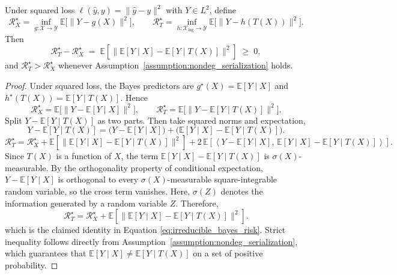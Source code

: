 \documentclass{llmxive}
\begin{document}
{\begin{lemma}
\label{lem:bayes_gap}
Under squared loss $\ell(\hat y,y)=\|\hat y-y\|^2$ with $Y\in L^2$, define
\begin{equation}
\mathcal{R}_X^\star=\inf_{g:\mathcal{X}\to\mathcal{Y}}\mathbb{E}\big[\|Y-g(X)\|^2\big],
\qquad
\mathcal{R}_T^\star=\inf_{h:\mathcal{X}_{\mathrm{lng}}\to\mathcal{Y}}\mathbb{E}\big[\|Y-h(T(X))\|^2\big].
\end{equation}
Then
\begin{equation}
\label{eq:irreducible_bayes_risk}
\mathcal{R}_T^\star - \mathcal{R}_X^\star
\;=\;
\mathbb{E}\!\left[\big\|\mathbb{E}[Y\mid X]-\mathbb{E}[Y\mid T(X)]\big\|^2\right]
\;\ge\; 0,
\end{equation}
and $\mathcal{R}_T^\star > \mathcal{R}_X^\star$ whenever Assumption~\ref{assumption:nondeg_serialization} holds.
\end{lemma}
\begin{proof}
Under squared loss, the Bayes predictors are $g^\star(X)=\mathbb{E}[Y\mid X]$ and $h^\star(T(X))=\mathbb{E}[Y\mid T(X)]$. Hence
\begin{equation}
\mathcal{R}_X^\star
=
\mathbb{E}\big[\|Y-\mathbb{E}[Y\mid X]\|^2\big],
\qquad
\mathcal{R}_T^\star
=
\mathbb{E}\big[\|Y-\mathbb{E}[Y\mid T(X)]\|^2\big].
\end{equation}
Split $Y-\mathbb{E}[Y\mid T(X)]$ as two parts. Then take squared norms and expectation,
\begin{equation}
Y-\mathbb{E}[Y\mid T(X)]
=
\big(Y-\mathbb{E}[Y\mid X]\big)
+
\big(\mathbb{E}[Y\mid X]-\mathbb{E}[Y\mid T(X)]\big).
\end{equation}
\begin{equation}
\mathcal{R}_T^\star=
\mathcal{R}_X^\star
+
\mathbb{E}\!\left[\big\|\mathbb{E}[Y\mid X]-\mathbb{E}[Y\mid T(X)]\big\|^2\right] 
+2\,\mathbb{E}\!\left[
\left\langle
Y-\mathbb{E}[Y\mid X],\,
\mathbb{E}[Y\mid X]-\mathbb{E}[Y\mid T(X)]
\right\rangle
\right].
\end{equation}
Since $T(X)$ is a function of $X$, the term $\mathbb{E}[Y\mid X]-\mathbb{E}[Y\mid T(X)]$ is $\sigma(X)$-measurable. By the orthogonality property of conditional expectation, $Y-\mathbb{E}[Y\mid X]$ is orthogonal to every $\sigma(X)$-measurable square-integrable random variable, so the cross term vanishes. Here, $\sigma(Z)$ denotes the information generated by a random variable $Z$. Therefore,
\begin{equation}
\mathcal{R}_T^\star
=
\mathcal{R}_X^\star
+
\mathbb{E}\!\left[\big\|\mathbb{E}[Y\mid X]-\mathbb{E}[Y\mid T(X)]\big\|^2\right].
\end{equation}
which is the claimed identity in Equation \ref{eq:irreducible_bayes_risk}. Strict inequality follows directly from Assumption~\ref{assumption:nondeg_serialization}, which guarantees that $\mathbb{E}[Y\mid X]\neq\mathbb{E}[Y\mid T(X)]$ on a set of positive probability.
\end{proof}

}
\end{document}
